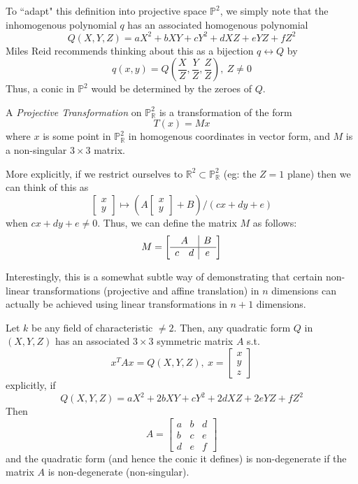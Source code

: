 To ``adapt" this definition into projective space $\mathbb{P}^2$, we simply
note that the inhomogenous polynomial $q$ has an associated
homogenous polynomial 
\[
Q(X,Y,Z) = aX^2 + bXY + cY^2 + dXZ + eYZ + fZ^2
\]
Miles Reid recommends thinking about this as a bijection $q \leftrightarrow Q$ by
\[
q(x,y) = Q(\frac{X}{Z},\frac{Y}{Z},\frac{Z}{Z}),~Z\ne 0
\]
Thus, a conic in $\mathbb{P}^2$ would be determined by the zeroes of $Q$.

\begin{mydef}
A \emph{Projective Transformation} on $\mathbb{P}^2_\mathbb{R}$ is a
transformation of the form
\[
T(x) = Mx
\]
where $x$ is some point in $\mathbb{P}^2_\mathbb{R}$ in homogenous coordinates in vector form,
and $M$ is a non-singular $3\times3$ matrix.
\end{mydef}

More explicitly, if we restrict ourselves to $\mathbb{R}^2 \subset \mathbb{P}^2_\mathbb{R}$
(eg: the $Z=1$ plane) then we can think of this as
\[
\begin{bmatrix}
x\\
y
\end{bmatrix} \mapsto
(A\begin{bmatrix}
x\\
y
\end{bmatrix} + B) / (cx+dy+e)
\]
when $cx+dy+e \ne 0$. Thus, we can define the matrix $M$ as follows:
\[
M= \left[\begin{array}{cc|c}
\multicolumn{2}{c|}{A} & B\\
\hline
c & d & e
\end{array}\right]
\]

Interestingly, this is a somewhat subtle way of demonstrating that certain
non-linear transformations (projective and affine translation) in $n$
dimensions can actually be achieved using linear transformations in $n+1$ dimensions.

\begin{theorem}
Let $k$ be any field of characteristic $\ne 2$. Then, any quadratic form $Q$
in $(X,Y,Z)$ has an associated $3 \times 3$ symmetric matrix $A$ s.t.
\[
x^TAx =  Q(X,Y,Z),~x=\begin{bmatrix}
x\\
y\\
z
\end{bmatrix}
\]
explicitly, if 
\[
Q(X,Y,Z) = aX^2 + 2bXY + cY^2 + 2dXZ + 2eYZ + fZ^2
\]
Then
\[
A = \begin{bmatrix}
a & b & d\\
b & c & e\\
d & e & f
\end{bmatrix}
\]
and the quadratic form (and hence the conic it defines) is non-degenerate
if the matrix $A$ is non-degenerate (non-singular).
\end{theorem}


